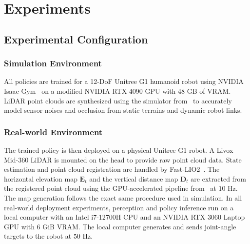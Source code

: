 \documentclass[letterpaper, 10 pt, conference]{ieeeconf/ieeeconf}
\DeclareRobustCommand{\RevisionAdd}[1]{{\color{red}#1}}
\begin{document}


\section{Experiments}
\label{sec:experiment}

\subsection{Experimental Configuration}
\label{sec:method_terrain}

\subsubsection{Simulation Environment} 

\RevisionAdd{All policies are trained for a 12-DoF Unitree G1 humanoid robot using NVIDIA Isaac Gym~\cite{Isaac_Gym} on a modified NVIDIA RTX 4090 GPU with 48 GB of VRAM.} LiDAR point clouds are synthesized using the simulator from~\cite{Wang_2025_Omni-Perception} \RevisionAdd{to} accurately model sensor noises and occlusion from static terrains and dynamic robot links.

\subsubsection{Real-world Environment} The trained policy is then deployed on a physical Unitree G1 robot. A Livox Mid-360 LiDAR is mounted on the head to provide raw point cloud data. State estimation and point cloud registration are handled by Fast-LIO2~\cite{Xu_2022_FAST-LIO2}. \RevisionAdd{The horizontal elevation map }$\mathbf{E}_t$ \RevisionAdd{and the vertical distance map $\mathbf{D}_t$ }are extracted from the registered point cloud using the GPU-accelerated pipeline from~\cite{ElevationMap_GPU_2022} at $10$ Hz. 
The map generation follows the exact same procedure used in simulation. \RevisionAdd{In all real-world deployment experiments, perception and policy inference run on a local computer with an Intel i7-12700H CPU and an NVIDIA RTX 3060 Laptop GPU with 6 GiB VRAM. The local computer generates and sends joint-angle targets to the robot at $50$ Hz}.
\end{document}
